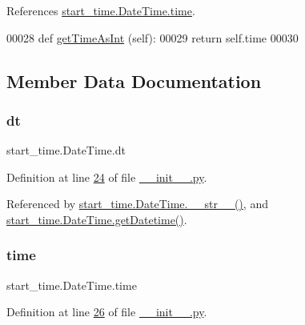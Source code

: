 References \hyperlink{start__time_2____init_____8py_source_l00026}{start\+\_\+time.\+Date\+Time.\+time}.


\begin{DoxyCode}
00028     \textcolor{keyword}{def }\hyperlink{namespacestart__time_a822927985dec03d75bfdf136d6ac6a97}{getTimeAsInt} (self):
00029         \textcolor{keywordflow}{return} self.time
00030     
\end{DoxyCode}


\subsection{Member Data Documentation}
\mbox{\label{classstart__time_1_1_date_time_af228dfce33d0bfbb39fb4fc5dabc0d48}} 
\subsubsection{\texorpdfstring{dt}{dt}}
{\footnotesize\ttfamily start\+\_\+time.\+Date\+Time.\+dt}



Definition at line \hyperlink{start__time_2____init_____8py_source_l00024}{24} of file \hyperlink{start__time_2____init_____8py_source}{\+\_\+\+\_\+init\+\_\+\+\_\+.\+py}.



Referenced by \hyperlink{start__time_2____init_____8py_source_l00034}{start\+\_\+time.\+Date\+Time.\+\_\+\+\_\+str\+\_\+\+\_\+()}, and \hyperlink{start__time_2____init_____8py_source_l00031}{start\+\_\+time.\+Date\+Time.\+get\+Datetime()}.

\mbox{\label{classstart__time_1_1_date_time_a0dae698e4497fabd9c0ff5066629e0ad}} 
\subsubsection{\texorpdfstring{time}{time}}
{\footnotesize\ttfamily start\+\_\+time.\+Date\+Time.\+time}



Definition at line \hyperlink{start__time_2____init_____8py_source_l00026}{26} of file \hyperlink{start__time_2____init_____8py_source}{\+\_\+\+\_\+init\+\_\+\+\_\+.\+py}.



